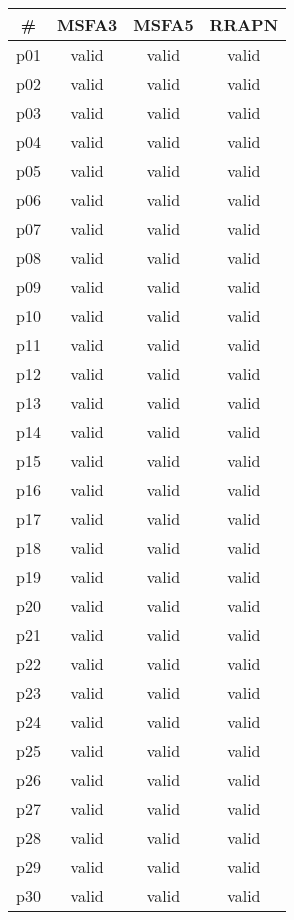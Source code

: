 \begin{tabular}{cccc}
\toprule
\textbf{\#} & \textbf{MSFA3} & \textbf{MSFA5} & \textbf{RRAPN}\\
\midrule
p01 & valid & valid & valid\\
p02 & valid & valid & valid\\
p03 & valid & valid & valid\\
p04 & valid & valid & valid\\
p05 & valid & valid & valid\\
p06 & valid & valid & valid\\
p07 & valid & valid & valid\\
p08 & valid & valid & valid\\
p09 & valid & valid & valid\\
p10 & valid & valid & valid\\
p11 & valid & valid & valid\\
p12 & valid & valid & valid\\
p13 & valid & valid & valid\\
p14 & valid & valid & valid\\
p15 & valid & valid & valid\\
p16 & valid & valid & valid\\
p17 & valid & valid & valid\\
p18 & valid & valid & valid\\
p19 & valid & valid & valid\\
p20 & valid & valid & valid\\
p21 & valid & valid & valid\\
p22 & valid & valid & valid\\
p23 & valid & valid & valid\\
p24 & valid & valid & valid\\
p25 & valid & valid & valid\\
p26 & valid & valid & valid\\
p27 & valid & valid & valid\\
p28 & valid & valid & valid\\
p29 & valid & valid & valid\\
p30 & valid & valid & valid\\
\bottomrule
\end{tabular}

